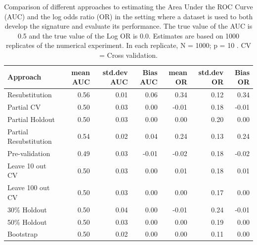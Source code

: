 \documentclass[11pt,]{article}
\begin{document}
\begin{table}

\caption{Comparison of different approaches to estimating the Area Under the ROC Curve (AUC) and the log odds ratio (OR) in the setting where a dataset is used to both develop the signature and evaluate its performance. The true value of the AUC is 0.5 and the true value of the Log OR is 0.0. Estimates are based on 1000 replicates of the numerical experiment. In each replicate,  N = 1000; p = 10 . CV = Cross validation. }
\centering
\begin{tabular}[t]{l|r|r|r|r|r|r}
\hline
Approach & mean AUC & std.dev AUC & Bias AUC & mean OR & std.dev OR & Bias OR\\
\hline
Resubstitution & 0.56 & 0.01 & 0.06 & 0.34 & 0.12 & 0.34\\
\hline
Partial CV & 0.50 & 0.03 & 0.00 & -0.01 & 0.18 & -0.01\\
\hline
Partial Holdout & 0.50 & 0.03 & 0.00 & 0.00 & 0.20 & 0.00\\
\hline
Partial Resubstitution & 0.54 & 0.02 & 0.04 & 0.24 & 0.13 & 0.24\\
\hline
Pre-validation & 0.49 & 0.03 & -0.01 & -0.02 & 0.18 & -0.02\\
\hline
Leave 10 out CV & 0.50 & 0.03 & 0.00 & 0.01 & 0.18 & 0.01\\
\hline
Leave 100 out CV & 0.50 & 0.03 & 0.00 & 0.00 & 0.17 & 0.00\\
\hline
30\% Holdout & 0.50 & 0.04 & 0.00 & -0.01 & 0.24 & -0.01\\
\hline
50\% Holdout & 0.50 & 0.03 & 0.00 & 0.00 & 0.19 & 0.00\\
\hline
Bootstrap & 0.50 & 0.02 & 0.00 & 0.00 & 0.11 & 0.00\\
\hline
\end{tabular}
\end{table}
\end{document}
